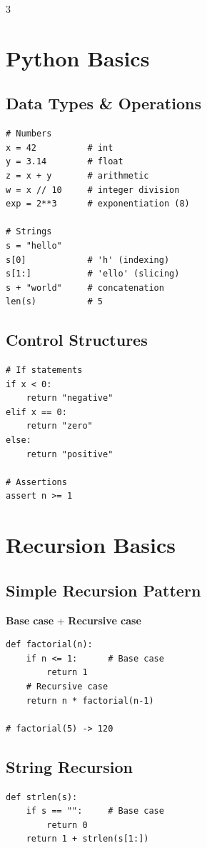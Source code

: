 \documentclass[8pt,landscape,a4paper]{article}
\begin{document}
\begin{multicols}{3}
\setlength{\columnseprule}{0.4pt}

\section*{Python Basics}

\subsection*{Data Types \& Operations}
\begin{lstlisting}
# Numbers
x = 42          # int
y = 3.14        # float
z = x + y       # arithmetic
w = x // 10     # integer division
exp = 2**3      # exponentiation (8)

# Strings
s = "hello"
s[0]            # 'h' (indexing)
s[1:]           # 'ello' (slicing)
s + "world"     # concatenation
len(s)          # 5
\end{lstlisting}

\subsection*{Control Structures}
\begin{lstlisting}
# If statements
if x < 0:
    return "negative"
elif x == 0:
    return "zero"
else:
    return "positive"

# Assertions
assert n >= 1
\end{lstlisting}

\section*{Recursion Basics}

\subsection*{Simple Recursion Pattern}
\textbf{Base case} + \textbf{Recursive case}

\begin{lstlisting}
def factorial(n):
    if n <= 1:      # Base case
        return 1
    # Recursive case
    return n * factorial(n-1)

# factorial(5) -> 120
\end{lstlisting}

\subsection*{String Recursion}
\begin{lstlisting}
def strlen(s):
    if s == "":     # Base case
        return 0
    return 1 + strlen(s[1:])


\end{lstlisting}
\end{multicols}
\end{document}
